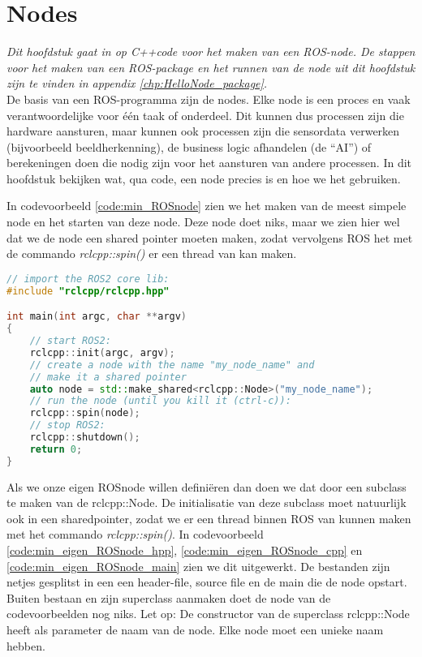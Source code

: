 \chapter{Nodes}
 \label{chp:ROS_nodes}
\textit{Dit hoofdstuk gaat in op C++code voor het maken van een ROS-node. De stappen voor het maken van een ROS-package en het runnen van de node uit dit hoofdstuk zijn te vinden in appendix \ref{chp:HelloNode_package}.}\\

\noindent De basis van een ROS-programma zijn de nodes. Elke node is een proces en vaak verantwoordelijke voor \'e\'en taak of onderdeel. Dit kunnen dus processen zijn die hardware aansturen, maar kunnen ook processen zijn die sensordata verwerken (bijvoorbeeld beeldherkenning), de business logic afhandelen (de ``AI'') of berekeningen doen die nodig zijn voor het aansturen van andere processen. In dit hoofdstuk bekijken wat, qua code, een node precies is en hoe we het gebruiken.

In codevoorbeeld \ref{code:min_ROSnode} zien we het maken van de meest simpele node en het starten van deze node. Deze node doet niks, maar we zien hier wel dat we de node een shared pointer moeten maken, zodat vervolgens ROS het met de commando \textit{rclcpp::spin()} er een thread van kan maken. 
\begin{lstlisting}[language=C++, caption={Het maken en runnen van een minimalistische ROS-Node.}, firstnumber=0, label={code:min_ROSnode}]
// import the ROS2 core lib:
#include "rclcpp/rclcpp.hpp" 

int main(int argc, char **argv)
{
    // start ROS2:
    rclcpp::init(argc, argv);
    // create a node with the name "my_node_name" and
    // make it a shared pointer
    auto node = std::make_shared<rclcpp::Node>("my_node_name");
    // run the node (until you kill it (ctrl-c)):
    rclcpp::spin(node);
    // stop ROS2:
    rclcpp::shutdown(); 
    return 0;
}
\end{lstlisting}

\noindent Als we onze eigen ROSnode willen definiëren dan doen we dat door een subclass te maken van de rclcpp::Node. De initialisatie van deze subclass moet natuurlijk ook in een sharedpointer, zodat we er een thread binnen ROS van kunnen maken met het commando \textit{rclcpp::spin()}. In codevoorbeeld \ref{code:min_eigen_ROSnode_hpp}, \ref{code:min_eigen_ROSnode_cpp} en \ref{code:min_eigen_ROSnode_main} zien we dit uitgewerkt. De bestanden zijn netjes gesplitst in een een header-file, source file en de main die de node opstart. Buiten bestaan en zijn superclass aanmaken doet de node van de codevoorbeelden nog niks. Let op: De constructor van de superclass rclcpp::Node heeft als parameter de naam van de node. Elke node moet een unieke naam hebben.

